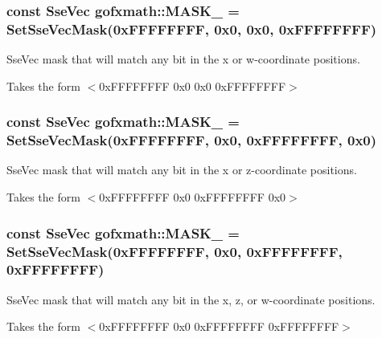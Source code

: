 \subsubsection[{M\+A\+S\+K\+\_\+1001}]{\setlength{\rightskip}{0pt plus 5cm}const {\bf Sse\+Vec} gofxmath\+::\+M\+A\+S\+K\+\_ = {\bf Set\+Sse\+Vec\+Mask}(0x\+F\+F\+F\+F\+F\+F\+F\+F, 0x0, 0x0, 0x\+F\+F\+F\+F\+F\+F\+F\+F)}\label{namespacegofxmath_a689cc233b7fa8e315c8cc38f474677df}


Sse\+Vec mask that will match any bit in the x or w-\/coordinate positions. 

Takes the form $<$0x\+F\+F\+F\+F\+F\+F\+F\+F 0x0 0x0 0x\+F\+F\+F\+F\+F\+F\+F\+F$>$ \hypertarget{namespacegofxmath_ac0b117ecea85861132b3f5bb90629497}{}
\subsubsection[{M\+A\+S\+K\+\_\+1010}]{\setlength{\rightskip}{0pt plus 5cm}const {\bf Sse\+Vec} gofxmath\+::\+M\+A\+S\+K\+\_ = {\bf Set\+Sse\+Vec\+Mask}(0x\+F\+F\+F\+F\+F\+F\+F\+F, 0x0, 0x\+F\+F\+F\+F\+F\+F\+F\+F, 0x0)}\label{namespacegofxmath_ac0b117ecea85861132b3f5bb90629497}


Sse\+Vec mask that will match any bit in the x or z-\/coordinate positions. 

Takes the form $<$0x\+F\+F\+F\+F\+F\+F\+F\+F 0x0 0x\+F\+F\+F\+F\+F\+F\+F\+F 0x0$>$ \hypertarget{namespacegofxmath_a93d32bd94a23c12d1e647ec1d5e25303}{}
\subsubsection[{M\+A\+S\+K\+\_\+1011}]{\setlength{\rightskip}{0pt plus 5cm}const {\bf Sse\+Vec} gofxmath\+::\+M\+A\+S\+K\+\_ = {\bf Set\+Sse\+Vec\+Mask}(0x\+F\+F\+F\+F\+F\+F\+F\+F, 0x0, 0x\+F\+F\+F\+F\+F\+F\+F\+F, 0x\+F\+F\+F\+F\+F\+F\+F\+F)}\label{namespacegofxmath_a93d32bd94a23c12d1e647ec1d5e25303}


Sse\+Vec mask that will match any bit in the x, z, or w-\/coordinate positions. 

Takes the form $<$0x\+F\+F\+F\+F\+F\+F\+F\+F 0x0 0x\+F\+F\+F\+F\+F\+F\+F\+F 0x\+F\+F\+F\+F\+F\+F\+F\+F$>$ \hypertarget{namespacegofxmath_aa909e3bfeab0b420da664a23efb26895}{}
